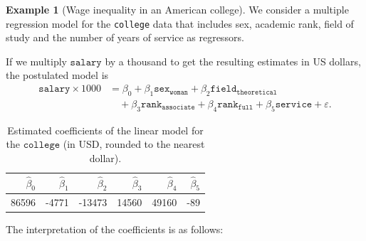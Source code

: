 \documentclass[
  11pt,
  letterpaper,
]{book}
\theoremstyle{definition}
\theoremstyle{definition}
\newtheorem{example}{Example}[chapter]
\theoremstyle{definition}
\theoremstyle{remark}
\begin{document}
\begin{example}[Wage inequality in an American college]
\protect\hypertarget{exm:inequite-salariale}{}{\label{exm:inequite-salariale} {} }We consider a multiple regression model for the \texttt{college} data that includes sex, academic rank, field of study and the number of years of service as regressors.
\end{example}

If we multiply \(\texttt{salary}\) by a thousand to get the resulting estimates in US dollars, the postulated model is
\begin{align*}
\texttt{salary}\times 1000 &= \beta_0 + \beta_1 \texttt{sex}_{\texttt{woman}} +\beta_2 \texttt{field}_{\texttt{theoretical}} \\&\quad +\beta_3 \texttt{rank}_{\texttt{associate}}
+\beta_4 \texttt{rank}_{\texttt{full}}  +\beta_5 \texttt{service} + \varepsilon.
\end{align*}

\begin{table}

\caption{\label{tab:collegecoefs}Estimated coefficients of the linear model for the $\texttt{college}$ (in USD, rounded to the nearest dollar).}
\centering
\begin{tabular}[t]{rrrrrr}
\toprule
$\widehat{\beta}_0$ & $\widehat{\beta}_1$ & $\widehat{\beta}_2$ & $\widehat{\beta}_3$ & $\widehat{\beta}_4$ & $\widehat{\beta}_5$\\
\midrule
86596 & -4771 & -13473 & 14560 & 49160 & -89\\
\bottomrule
\end{tabular}
\end{table}

The interpretation of the coefficients is as follows:
\end{document}
